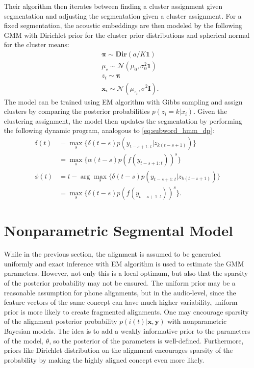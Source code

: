 Their algorithm then iterates between finding a cluster assignment given segmentation and adjusting the segmentation given a cluster assignment. For a fixed segmentation, the acoustic embeddings are then modeled by the following GMM with Dirichlet prior for the cluster prior distributions and spherical normal for the cluster means: 
\begin{align}\label{eq:generate_bes_gmm}
    & \mathbf \pi \sim \mathbf{Dir}(a/K \mathbf 1)\\
    & \mu_c \sim \mathcal N(\mu_0, \sigma_0^2 \mathbf 1) \\
    & z_i \sim \mathbf \pi \\
    & \mathbf x_i \sim \mathcal N(\mu_{z_i}, \sigma^2 \mathbf I).
\end{align}
The model can be trained using EM algorithm with Gibbs sampling and assign clusters by comparing the posterior probabilities $p(z_i=k|x_i)$. Given the clustering assignment, the model then updates the segmentation by performing the following dynamic program, analogous to \ref{eq:subword_hmm_dp}:
\begin{align}\label{eq:bes_gmm_dp}
    \delta(t) &= \max_{s}\{\delta(t-s) p(y_{t-s+1:t}|z_{k(t-s+1)})\} \\
    &= \max_s \{\alpha(t-s) p(f(y_{t-s+1:t}))^s\}\\
    \phi(t) &= t - \arg \max_{s}\{\delta(t-s) p(y_{t-s+1:t}|z_{k(t-s+1)})\} \\
    &= \max_s \{\delta(t-s) p(f(y_{t-s+1:t}))^s\}.
\end{align}

\section{Nonparametric Segmental Model}
While in the previous section, the alignment is assumed to be generated uniformly and exact inference with EM algorithm is used to estimate the GMM parameters. However, not only this is a local optimum, but also that the sparsity of the posterior probability may not be ensured. The uniform prior may be a reasonable assumption for phone alignments, but in the audio-level, since the feature vectors of the same concept can have much higher variability, uniform prior is more likely to create fragmented alignments. One may encourage sparsity of the alignment posterior probability $p(i(t)|\mathbf x, \mathbf y)$ with nonparametric Bayesian models. The idea is to add a weakly informative prior to the parameters of the model, $\theta$, so the posterior of the parameters is well-defined. Furthermore, priors like Dirichlet distribution on the alignment encourages sparsity of the probability by making the highly aligned concept even more likely.

